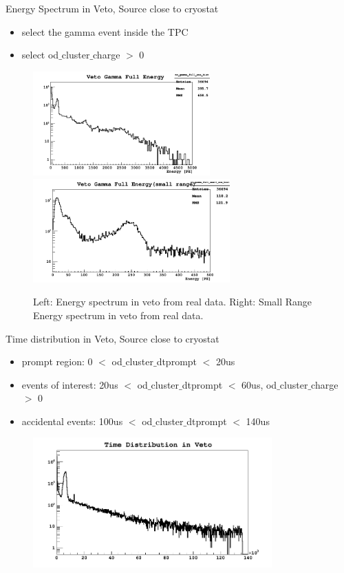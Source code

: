 \documentclass[9pt]{beamer}
\begin{document}
\begin{frame}{Energy Spectrum in Veto, Source close to cryostat}
\begin{itemize}
[bullet]
\item select the gamma event inside the TPC 
\item  select od$\_$cluster$\_$charge $>$ 0
\end{itemize}
\begin{figure}
\includegraphics[height= 4cm, width=.5\textwidth]{nv_gamma_full_ene_Feb7PM.png}
\includegraphics[height= 4cm, width=.5\textwidth]{nv_gamma_full_small_ene_Feb7PM.png}
\caption{Left: Energy spectrum in veto from real data. Right: Small Range Energy spectrum in veto from real data.}
\end{figure}
\end{frame}

\begin{frame}{Time distribution in Veto, Source close to cryostat}
\begin{itemize}
[bullet]
\item prompt region: 0 $<$ od$\_$cluster$\_$dtprompt $<$ 20us
\item events of interest: 20us $<$ od$\_$cluster$\_$dtprompt $<$ 60us, od$\_$cluster$\_$charge $>$ 0
\item accidental events: 100us $<$ od$\_$cluster$\_$dtprompt $<$ 140us
\end{itemize}
\begin{figure}
\includegraphics[height= 5cm, width=\textwidth]{nv_ntuple_time_Feb7PM.png}
\end{figure}
\end{frame}
\end{document}

